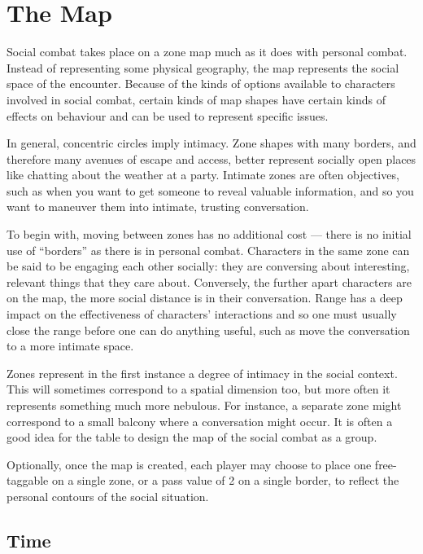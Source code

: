 \section{The Map}\label{sec:social-combat-map}
\vfil

Social combat takes place on a zone map much as it does with personal combat. Instead of representing some physical geography, the map represents the social space of the encounter. Because of the kinds of options available to characters involved in social combat, certain kinds of map shapes have certain kinds of effects on behaviour and can be used to represent specific issues.

In general, concentric circles imply intimacy. Zone shapes with many borders, and therefore many avenues of escape and access, better represent socially open places like chatting about the weather at a party. Intimate zones are often objectives, such as when you want to get someone to reveal valuable information, and so you want to maneuver them into intimate, trusting conversation.

To begin with, moving between zones has no additional cost --- there is no initial use of ``borders'' as there is in personal combat. Characters in the same zone can be said to be engaging each other socially: they are conversing about interesting, relevant things that they care about. Conversely, the further apart characters are on the map, the more social distance is in their conversation. Range has a deep impact on the effectiveness of characters' interactions and so one must usually close the range before one can do anything useful, such as move the conversation to a more intimate space.

Zones represent in the first instance a degree of intimacy in the social context. This will sometimes correspond to a spatial dimension too, but more often it represents something much more nebulous. For instance, a separate zone might correspond to a small balcony where a conversation might occur. It is often a good idea for the table to design the map of the social combat as a group.

Optionally, once the map is created, each player may choose to place one free-taggable \Aspect{} on a single zone, or a pass value of 2 on a single border, to reflect the personal contours of the social situation.


\subsection{Time}\label{sec:Time}

